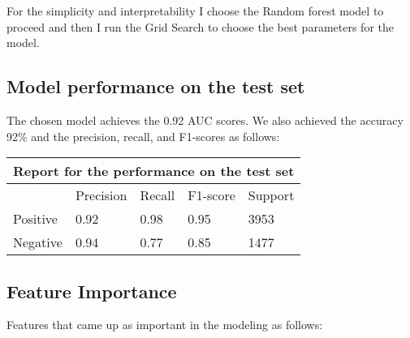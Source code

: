\documentclass[oneside,12pt,reqno]{amsart}
\theoremstyle{definition}
\begin{document}
\vspace{0.2in}
For the simplicity and interpretability I choose the Random forest model to proceed and then I run the Grid Search to choose the best parameters for the model.

\subsection{Model performance on the test set}

The chosen model achieves the 0.92 AUC scores. We also achieved the accuracy 92\% and the precision, recall, and F1-scores as follows:

\begin{tabular}{ |p{2cm}||p{2cm}|p{2cm}|p{2cm}|p{2cm}|  }
 \hline
 \multicolumn{5}{|c|}{Report for the performance on the test set} \\
 \hline
\text{ }& Precision & Recall & F1-score & Support\\
 \hline
 Positive   & 0.92    &0.98&   0.95 & 3953\\
 Negative&   0.94  & 0.77   &0.85& 1477\\
 \hline
\end{tabular}

\vspace{0.2in}

\subsection{Feature Importance} Features that came up as important in the modeling as follows:
\end{document}
